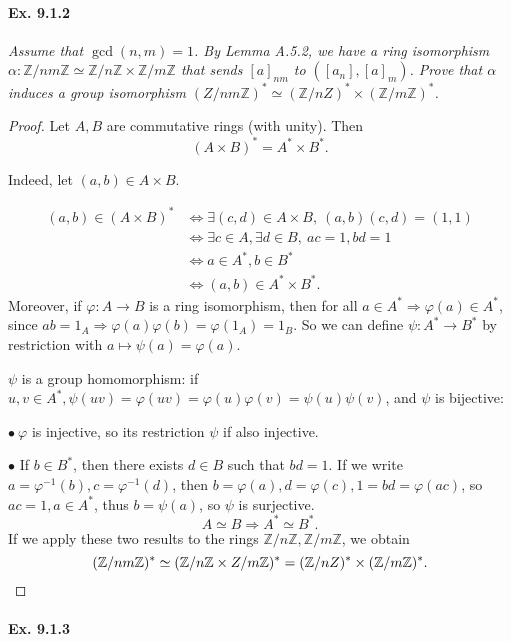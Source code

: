 \documentclass[11pt,a4paper]{article}
\newcommand{\Z}{\mathbb{Z}}
\begin{document}
\paragraph{Ex. 9.1.2}

{\it Assume that $\gcd(n,m) =1$. By Lemma A.5.2, we have a ring isomorphism $\alpha : \Z/nm\Z \simeq \Z/n\Z \times \Z/m\Z$ that sends $[a]_{nm}$ to $([a_n],[a]_m)$. Prove that $\alpha$ induces a group isomorphism $(Z/nm\Z)^* \simeq (\Z/nZ)^* \times (\Z/m\Z)^*$.
}

\begin{proof}
Let $A,B$ are commutative rings (with unity). Then $$(A\times B)^* = A^*\times B^*.$$

Indeed, let $(a,b)\in A\times B$.

\begin{align*}
(a,b) \in (A\times B)^* &\iff \exists (c,d) \in A\times B, \ (a,b)(c,d) = (1,1)\\
 &\iff \exists c \in A, \exists d \in B, \ ac=1,bd=1\\
  &\iff a\in A^*, b\in B^* \\
  &\iff (a,b)\in A^*\times B^*.
 \end{align*}
Moreover, if $\varphi : A\to B$ is a ring isomorphism, then for all $a \in A^* \Rightarrow \varphi(a) \in A^*$, since $ab = 1_A \Rightarrow \varphi(a) \varphi(b) = \varphi(1_A) = 1_B$. So we can define
$\psi : A^* \to B^*$ by restriction with $a\mapsto \psi(a) = \varphi(a)$.

$\psi$ is a group homomorphism: if $u,v \in A^*, \psi(uv) = \varphi(uv) = \varphi(u)\varphi(v) = \psi(u)\psi(v)$, and $\psi$ is bijective:

$\bullet\ \varphi$ is injective, so its restriction $\psi$ if also injective.

$\bullet$ If $b\in B^*$, then there exists $d \in B$ such that $bd=1$. If we write $a=\varphi^{-1}(b), c=\varphi^{-1}(d)$, then $b=\varphi(a), d=\varphi(c), 1 = bd = \varphi(ac)$, so $ac = 1, a \in A^*$, thus $b=\psi(a)$, so $\psi$ is surjective.
$$A\simeq B \Rightarrow A^* \simeq B^*.$$
If we apply these two results to the rings $\Z/n\Z, \Z/m\Z$, we obtain
$$(\Z/nm\Z)^* \simeq (\Z/n\Z \times \\Z/m\Z)^* = (\Z/nZ)^* \times (\Z/m\Z)^*.$$
\end{proof}

\paragraph{Ex. 9.1.3}
\end{document}
